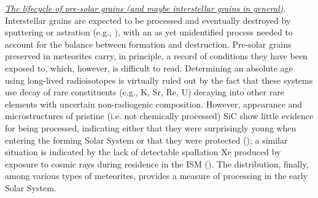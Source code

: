 \documentclass{iau}
\begin{document}
{\underline{\it The lifecycle of pre-solar grains (and maybe interstellar grains in general)}}. Interstellar grains
are expected to be processed and eventually destroyed by sputtering or astration (e.g.,
\cite[Draine 2003]{Draine03}), with an as yet unidentified process needed to account for the balance between
formation and destruction. Pre-solar grains preserved in meteorites carry, in principle, a
record of conditions they have been exposed to, which, however, is difficult to read.
Determining an absolute age using long-lived radioisotopes is virtually ruled out by the fact
that these systems use decay of rare constituents (e.g., K, Sr, Re, U) decaying into other rare
elements with uncertain non-radiogenic composition. However, appearance and
microstructures of pristine (i.e. not chemically processed) SiC show little evidence for being
processed, indicating either that they were surprisingly young when entering the forming
Solar System or that they were protected 
(\cite[Bernatowicz et al. 2003]{Bernatowicz_etal03}); a similar situation is
indicated by the lack of detectable spallation Xe produced by exposure to cosmic rays during residence in the ISM 
(\cite[Ott et al.  2005]{Ott_etal05}). The distribution, finally, among various types of
meteorites, provides a measure of processing in the early Solar System.
\end{document}
